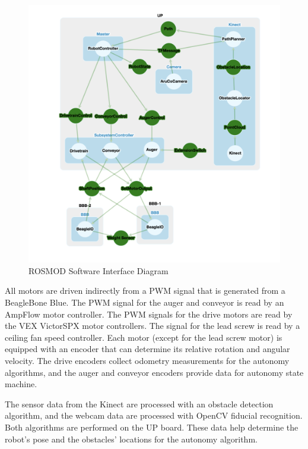 \documentclass[class=article, crop=false]{standalone}
\begin{document}
	\FloatBarrier
	\begin{figure}
		\centering
		\includegraphics[width=1\linewidth]{09_Figures/programming_interfaces.png}
		\caption{ROSMOD Software Interface Diagram}
		\label{fig:software_interfaces}
	\end{figure}
	\FloatBarrier
	
	All motors are driven indirectly from a PWM signal that is generated from a BeagleBone Blue. The PWM signal for the auger and conveyor is read by an AmpFlow motor controller. The PWM signals for the drive motors are read by the VEX VictorSPX motor controllers. The signal for the lead screw is read by a ceiling fan speed controller. Each motor (except for the lead screw motor) is equipped with an encoder that can determine its relative rotation and angular velocity. The drive encoders collect odometry measurements for the autonomy algorithms, and the auger and conveyor encoders provide data for autonomy state machine. 
	
	The sensor data from the Kinect are processed with an obstacle detection algorithm, and the webcam data are processed with OpenCV fiducial recognition. Both algorithms are performed on the UP board. These data help determine the robot’s pose and the obstacles’ locations for the autonomy algorithm. 
	
\end{document}
